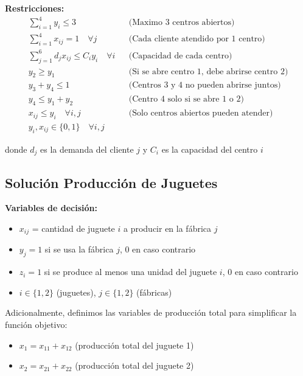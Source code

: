 \documentclass[12pt]{article}
\begin{document}
\textbf{Restricciones:}
\begin{align*}
    \sum_{i=1}^{4} y_i \leq 3 && \text{(Maximo 3 centros abiertos)} \\
    \sum_{i=1}^{4} x_{ij} = 1 \quad \forall j && \text{(Cada cliente atendido por 1 centro)} \\
    \sum_{j=1}^{6} d_j x_{ij} \leq C_i y_i \quad \forall i && \text{(Capacidad de cada centro)} \\
    y_2 \geq y_1 && \text{(Si se abre centro 1, debe abrirse centro 2)} \\
    y_3 + y_4 \leq 1 && \text{(Centros 3 y 4 no pueden abrirse juntos)} \\
    y_4 \leq y_1 + y_2 && \text{(Centro 4 solo si se abre 1 o 2)} \\
    x_{ij} \leq y_i \quad \forall i,j && \text{(Solo centros abiertos pueden atender)} \\
    y_i, x_{ij} \in \{0,1\} \quad \forall i,j
\end{align*}
\begin{center}
donde $d_j$ es la demanda del cliente $j$ y $C_i$ es la capacidad del centro $i$
\end{center}

\subsection{Solución Producción de Juguetes}

\textbf{Variables de decisión:}
\begin{itemize}
    \item $x_{ij}$ = cantidad de juguete $i$ a producir en la fábrica $j$
    \item $y_j = 1$ si se usa la fábrica $j$, 0 en caso contrario
    \item $z_i = 1$ si se produce al menos una unidad del juguete $i$, 0 en caso contrario
    \item $i \in \{1, 2\}$ (juguetes), $j \in \{1, 2\}$ (fábricas)
\end{itemize}

Adicionalmente, definimos las variables de producción total para simplificar la función objetivo:
\begin{itemize}
    \item $x_1 = x_{11} + x_{12}$ (producción total del juguete 1)
    \item $x_2 = x_{21} + x_{22}$ (producción total del juguete 2)
\end{itemize}
\end{document}
